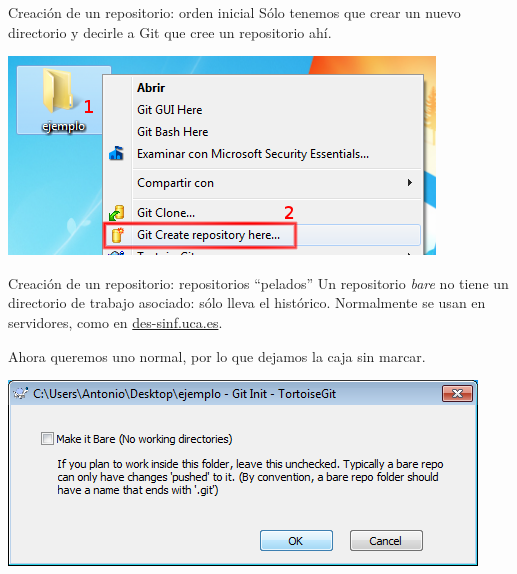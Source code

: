 \documentclass[xcolor=svgnames]{beamer}
\begin{document}
\begin{frame}{Creación de un repositorio: orden inicial}
  Sólo tenemos que crear un nuevo directorio y decirle a Git que cree
  un repositorio ahí.

  \begin{center}
    \includegraphics[width=\textwidth,height=.5\textheight,keepaspectratio]{tomas/crearrepo-00-menu}
  \end{center}
\end{frame}

\begin{frame}{Creación de un repositorio: repositorios ``pelados''}
  Un repositorio \emph{bare} no tiene un directorio de trabajo
  asociado: sólo lleva el histórico. Normalmente se usan en
  servidores, como en \url{des-sinf.uca.es}.

  Ahora queremos uno normal, por lo que dejamos la caja sin marcar.

  \begin{center}
    \includegraphics[width=\textwidth,height=.5\textheight,keepaspectratio]{tomas/crearrepo-01-bare}
  \end{center}
\end{frame}
\end{document}
